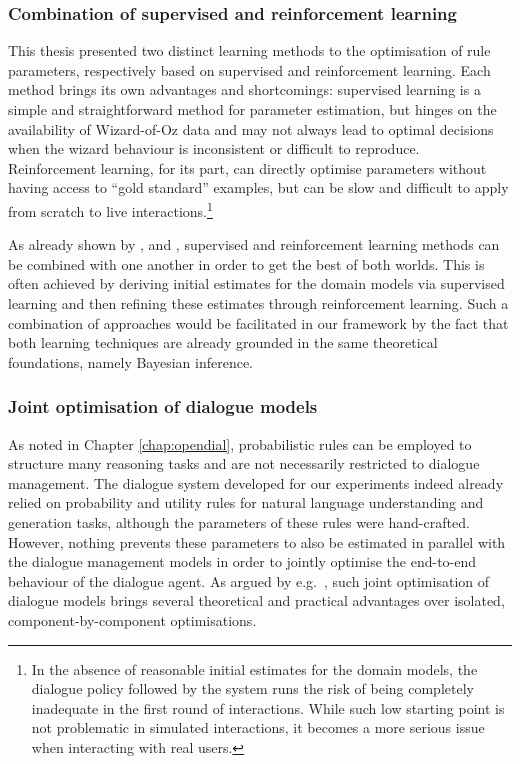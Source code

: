 \subsubsection*{Combination of supervised and reinforcement learning}

This thesis presented two distinct learning methods to the optimisation of rule parameters, respectively based on supervised and reinforcement learning.  Each method brings its own advantages and shortcomings: supervised learning is a simple and straightforward method for parameter estimation, but hinges on the availability of Wizard-of-Oz data and may not always lead to optimal decisions when the wizard behaviour is inconsistent or difficult to reproduce.  Reinforcement learning, for its part, can directly optimise parameters without having access to ``gold standard'' examples, but can be slow and difficult to apply from scratch to live interactions.\footnote{In the absence of reasonable initial estimates for the domain models, the dialogue policy followed by the system runs the risk of being completely inadequate in the first round of interactions.  While such low starting point is not problematic in simulated interactions, it becomes a more serious issue when interacting with real users.} 

As already shown by \cite{williams2003}, \cite{rieser2006} and \cite{Henderson:2008}, supervised and reinforcement learning methods can be combined with one another in order to get the best of both worlds. This is often achieved by deriving initial estimates for the domain models via supervised learning and then refining these estimates through reinforcement learning. Such a combination of approaches would be facilitated in our framework by the fact that both learning techniques are already grounded in the same theoretical foundations, namely Bayesian inference. 

\subsubsection*{Joint optimisation of dialogue models}

As noted in Chapter \ref{chap:opendial}, probabilistic rules can be employed to structure many reasoning tasks and are not necessarily restricted to dialogue management. The dialogue system developed for our experiments indeed already relied on probability and utility rules for natural language understanding and generation tasks, although the parameters of these rules were hand-crafted. However, nothing prevents these parameters to also be estimated in parallel with the dialogue management models in order to jointly optimise the end-to-end behaviour of the dialogue agent.  As argued by e.g.\ \cite{Lemon:2011}, such joint optimisation of dialogue models brings several theoretical and practical advantages over isolated, component-by-component optimisations.

